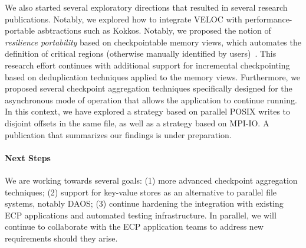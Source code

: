 We also started several exploratory directions that resulted in
several research publications. Notably, we explored how to integrate
VELOC with performance-portable asbtractions such as Kokkos. Notably,
we proposed the notion of \emph{resilience portability} based on
checkpointable memory views, which automates the definition of
critical regions (otherwise manually identified by
users)~\cite{PortResEuroPar21}. This research effort continues with
additional support for incremental checkpointing based on
deduplication techniques applied to the memory views. Furthermore, we
proposed several checkpoint aggregation techniques specifically
designed for the asynchronous mode of operation that allows the
application to continue running. In this context, we have explored a
strategy based on parallel POSIX writes to disjoint offsets in the
same file, as well as a strategy based on MPI-IO. A publication that
summarizes our findings is under preparation.

\paragraph{Next Steps}
We are working towards several goals: (1) more advanced checkpoint
aggregation techniques; (2) support for key-value stores as an
alternative to parallel file systems, notably DAOS; (3) continue
hardening the integration with existing ECP applications and automated
testing infrastructure.  In parallel, we will continue to collaborate
with the ECP application teams to address new requirements should they
arise.
